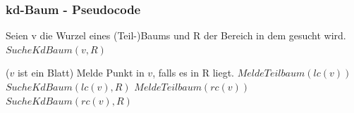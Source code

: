 \begin{frame}
	\frametitle{kd-Baum - Pseudocode}
	Seien v die Wurzel eines (Teil-)Baums und R der Bereich in dem gesucht wird.\\
	$SucheKdBaum(v, R)$
	\begin{algorithmic}
	\If ($v$ ist ein Blatt)
		\State Melde Punkt in $v$, falls es in R liegt.
	\Else
		\pause
		{
			\State $MeldeTeilbaum(lc(v))$
			\pause
		\Else
				\State $SucheKdBaum(lc(v),R)$				
			\EndIf
		\EndIf
		\pause
			\State $MeldeTeilbaum(rc(v))$
		\Else
				\State $SucheKdBaum(rc(v),R)$				
			\EndIf
		\EndIf}
	\EndIf
	\end{algorithmic}
\end{frame}